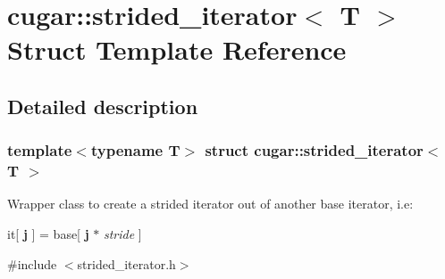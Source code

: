 \hypertarget{structcugar_1_1strided__iterator}{}\section{cugar\+:\+:strided\+\_\+iterator$<$ T $>$ Struct Template Reference}
\label{structcugar_1_1strided__iterator}


\subsection{Detailed description}
\subsubsection*{template$<$typename T$>$\newline
struct cugar\+::strided\+\_\+iterator$<$ T $>$}

Wrapper class to create a strided iterator out of another base iterator, i.\+e\+:

it\mbox{[} {\bfseries j} \mbox{]} = base\mbox{[} {\bfseries j} $\ast$ {\itshape stride} \mbox{]} 

{\ttfamily \#include $<$strided\+\_\+iterator.\+h$>$}

